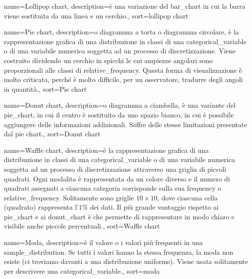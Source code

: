 {
	 name={Lollipop chart},
	 description={\`e una variazione del \gls{bar_chart} in cui la barra viene sostituita da una linea e un cerchio.},
	 sort={lollipop chart}
}

{
	 name={Pie chart},
	 description={o diagramma a torta o diagramma circolare, \`e la rappresentazione grafica di una distribuzione in classi di una \gls{categorical_variable} o di una variabile numerica soggetta ad un processo di \gls{discretizzazione}. Viene costruito dividendo un cerchio in spicchi le cui ampiezze angolari sono proporzionali alle classi di \gls{relative_frequency}. Questa forma di visualizzazione \`e molto criticata, perch\'e \`e molto difficile, per un osservatore, tradurre degli angoli in quantit\`a.},
	 sort={Pie chart}
}

{
	 name={Donut chart},
	 description={o diagramma a ciambella, \`e una variante del \gls{pie_chart}, in cui il centro \`e sostituito da uno spazio bianco, in cui \`e possibile aggiungere delle informazioni addizionali. Soffre delle stesse limitazioni presentate dal pie chart.},
	 sort={Donut chart}
}

{
	 name={Waffle chart},
	 description={\`e la rappresentazione grafica di una distribuzione in classi di una \gls{categorical_variable} o di una variabile numerica soggetta ad un processo di \gls{discretizzazione} attraverso una griglia di piccoli quadrati. Ogni \gls{modalita} \`e rappresentata da un colore diverso e il numero di quadrati assegnati a ciascuna categoria corrisponde sulla sua \gls{frequency} o \gls{relative_frequency}. Solitamente sono griglie $10 \times 10$, dove ciascuna cella (quadrato) rappresenta l'$1\%$ dei dati. Il pi\`u grande vantaggio rispetto ai \gls{pie_chart} e ai \gls{donut_chart} \`e che permette di rappresentare in modo chiaro e visibile anche piccole percentuali.},
	 sort={Waffle chart}
}


{
	 name={Moda},
	 description={\`e il valore o i valori pi\`u frequenti in una \gls{sample_distribution}. Se tutti i valori hanno la stessa frequenza, la moda non esiste (ci troviamo davanti a una distribuzione uniforme). Viene usata solitamente per descrivere una \gls{categorical_variable}.},
	 sort={moda}
}

